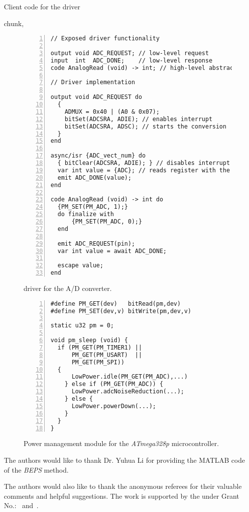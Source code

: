 Client code for the driver


 chunk,


\begin{figure}[t]
\begin{lstlisting}[numbers=left]
// Exposed driver functionality

output void ADC_REQUEST; // low-level request
input  int  ADC_DONE;    // low-level response
code AnalogRead (void) -> int; // high-level abstraction

// Driver implementation

output void ADC_REQUEST do
  {
    ADMUX = 0x40 | (A0 & 0x07);
    bitSet(ADCSRA, ADIE); // enables interrupt
    bitSet(ADCSRA, ADSC); // starts the conversion
  }
end

async/isr {ADC_vect_num} do
  { bitClear(ADCSRA, ADIE); } // disables interrupt
  var int value = {ADC}; // reads register with the value
  emit ADC_DONE(value);
end

code AnalogRead (void) -> int do
  {PM_SET(PM_ADC, 1);}
  do finalize with
      {PM_SET(PM_ADC, 0);}
  end

  emit ADC_REQUEST(pin);
  var int value = await ADC_DONE;

  escape value;
end
\end{lstlisting}
\caption{ \CEU driver for the A/D converter.
\label{lst.adc}
}
\end{figure}

\begin{figure}[t]
\begin{lstlisting}[numbers=left]
#define PM_GET(dev)   bitRead(pm,dev)
#define PM_SET(dev,v) bitWrite(pm,dev,v)

static u32 pm = 0;

void pm_sleep (void) {
  if (PM_GET(PM_TIMER1) ||
      PM_GET(PM_USART)  ||
      PM_GET(PM_SPI))
  {
      LowPower.idle(PM_GET(PM_ADC),...)
    } else if (PM_GET(PM_ADC)) {
      LowPower.adcNoiseReduction(...);
    } else {
      LowPower.powerDown(...);
    }
  }
}
\end{lstlisting}
\caption{ Power management module for the \emph{ATmega328p} microcontroller.
\label{lst.pm}
}
\end{figure}


\begin{acks}
  The authors would like to thank Dr. Yuhua Li for providing the
  MATLAB code of the \textit{BEPS} method.

  The authors would also like to thank the anonymous referees for
  their valuable comments and helpful suggestions. The work is
  supported by the  under Grant
  No.:~
  and~.

\end{acks}
